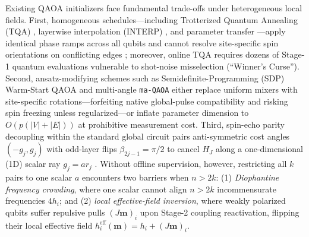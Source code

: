 \documentclass[10pt,a4paper]{article}
\begin{document}
Existing QAOA initializers face fundamental trade-offs under heterogeneous local fields. First, homogeneous schedules---including Trotterized Quantum Annealing (TQA) \citep{farhi2001quantum,kadowaki1998quantum,yang2017optimizing,sack2021quantum,wurtz2022counterdiabaticity}, layerwise interpolation (INTERP) \citep{crooks2018performance,zhou2020quantum}, and parameter transfer \citep{brandao2018fixed,galda2021transferability,shaydulin2023parameter}---apply identical phase ramps across all qubits and cannot resolve site-specific spin orientations on conflicting edges \citep{katial2025instance}; moreover, online TQA requires dozens of Stage-1 quantum evaluations vulnerable to shot-noise misselection (``Winner's Curse''). Second, ansatz-modifying schemes such as Semidefinite-Programming (SDP) Warm-Start QAOA \citep{bravyi2020obstacles,egger2021warm,tate2023warm} and multi-angle \texttt{ma-QAOA} \citep{herrman2022multi} either replace uniform mixers with site-specific rotations---forfeiting native global-pulse compatibility and risking spin freezing unless regularized---or inflate parameter dimension to $O(p(|V|+|E|))$ at prohibitive measurement cost. Third, spin-echo parity decoupling within the standard global circuit \citep{hahn1950spin,carr1954effects,viola1999dynamical,vandersypen2005nmr,yao2026echo} pairs anti-symmetric cost angles $(-g_j, g_j)$ with odd-layer flips $\beta_{2j-1} = \pi/2$ to cancel $H_J$ along a one-dimensional (1D) scalar ray $g_j = a r_j$ \citep{daubechies1988orthonormal,low2016methodology,low2017optimal,gilyen2019quantum,yao2026echo}. Without offline supervision, however, restricting all $k$ pairs to one scalar $a$ encounters two barriers when $n > 2k$: (1) \emph{Diophantine frequency crowding}, where one scalar cannot align $n > 2k$ incommensurate frequencies $4h_i$; and (2) \emph{local effective-field inversion}, where weakly polarized qubits suffer repulsive pulls $(J\boldsymbol{m})_i$ upon Stage-2 coupling reactivation, flipping their local effective field $h_i^{\mathrm{eff}}(\boldsymbol{m}) = h_i + (J\boldsymbol{m})_i$.
\end{document}
